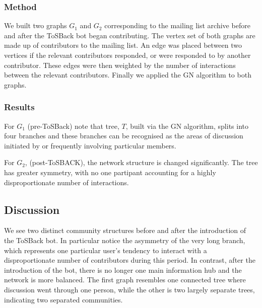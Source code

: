 \documentclass{sig-alternate}
\begin{document}
\subsubsection{Method}

We built two graphs $G_{1}$ and $G_2$ corresponding to the mailing list archive before and after the ToSBack bot began contributing. The vertex set of both graphs are made up of contributors to the mailing list. An edge was placed between two vertices if the relevant contributors responded, or were responded to by another contributor. These edges were then weighted by the number of interactions between the relevant contributors. Finally we applied the GN algorithm to both graphs.


\subsubsection{Results}


For $G_1$ (pre-ToSBack) note that tree, $T$, built via the GN algorithm, splits into four branches and these branches can be recognised as the areas of discussion initiated by or frequently involving particular members.


For $G_2$, (post-ToSBACK), the network structure is changed significantly. The tree has greater symmetry, with no one partipant accounting for a highly disproportionate number of interactions.

\subsection{Discussion}

We see two distinct community structures before and after the introduction of the ToSBack bot. In particular notice the asymmetry of the very long branch, which represents one particular user's tendency to interact with a disproportionate number of contributors during this period. In contrast, after the introduction of the bot, there is no longer one main information hub and the network is more balanced. The first graph resembles one connected tree where discussion went through one person, while the other is two largely separate trees, indicating two separated communities.
\end{document}

